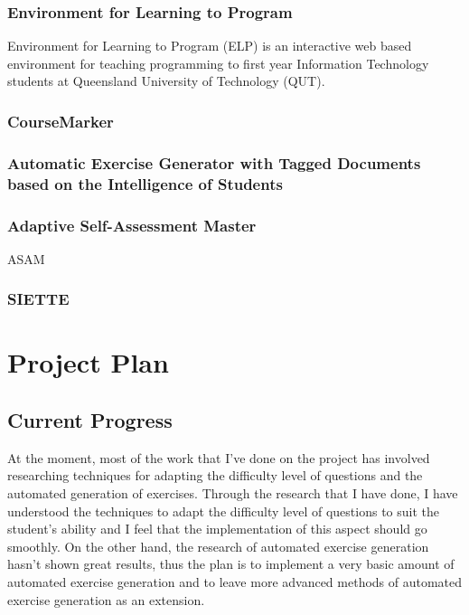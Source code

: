 \documentclass[11pt,a4paper]{report}
\begin{document}
\subsection{Environment for Learning to Program}
Environment for Learning to Program (ELP) is an interactive web based environment for teaching programming to first year Information Technology students at Queensland University of Technology (QUT).

\subsection{CourseMarker}

\subsection{Automatic Exercise Generator with Tagged Documents based on the Intelligence of Students}

\subsection{Adaptive Self-Assessment Master}
ASAM

\subsection{SIETTE}



\chapter{Project Plan}
\section{Current Progress}
At the moment, most of the work that I've done on the project has involved researching techniques for adapting the difficulty level of questions and the automated generation of exercises. Through the research that I have done, I have understood the techniques to adapt the difficulty level of questions to suit the student's ability and I feel that the implementation of this aspect should go smoothly. On the other hand, the research of automated exercise generation hasn't shown great results, thus the plan is to implement a very basic amount of automated exercise generation and to leave more advanced methods of automated exercise generation as an extension. \newline
\end{document}
